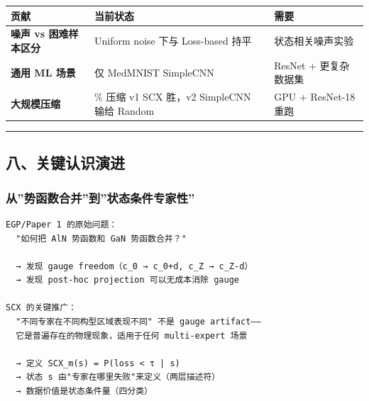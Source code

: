 \documentclass[
  12pt,
]{ctexart}
\begin{document}
\begin{longtable}[]{@{}
  >{\raggedright\arraybackslash}p{}
  >{\raggedright\arraybackslash}p{}
  >{\raggedright\arraybackslash}p{}@{}}
\toprule\noalign{}
\begin{minipage}[b]{\linewidth}\raggedright
贡献
\end{minipage} & \begin{minipage}[b]{\linewidth}\raggedright
当前状态
\end{minipage} & \begin{minipage}[b]{\linewidth}\raggedright
需要
\end{minipage} \\
\midrule\noalign{}
\endhead
\bottomrule\noalign{}
\endlastfoot
\textbf{噪声 vs 困难样本区分} & Uniform noise 下与 Loss-based 持平 &
状态相关噪声实验 \\
\textbf{通用 ML 场景} & 仅 MedMNIST SimpleCNN & ResNet + 更复杂数据集 \\
\textbf{大规模压缩} & 50\% 压缩 v1 SCX 胜，v2 SimpleCNN 输给 Random &
GPU + ResNet-18 重跑 \\
\end{longtable}

\begin{center}\rule{0.5\linewidth}{0.5pt}\end{center}

\subsection{八、关键认识演进}\label{ux516bux5173ux952eux8ba4ux8bc6ux6f14ux8fdb}

\subsubsection{从''势函数合并''到''状态条件专家性''}\label{ux4eceux52bfux51fdux6570ux5408ux5e76ux5230ux72b6ux6001ux6761ux4ef6ux4e13ux5bb6ux6027}

\begin{verbatim}
EGP/Paper 1 的原始问题：
  "如何把 AlN 势函数和 GaN 势函数合并？"
  
  → 发现 gauge freedom（c_0 → c_0+d, c_Z → c_Z-d）
  → 发现 post-hoc projection 可以无成本消除 gauge
  
SCX 的关键推广：
  "不同专家在不同构型区域表现不同" 不是 gauge artifact——
  它是普遍存在的物理现象，适用于任何 multi-expert 场景
  
  → 定义 SCX_m(s) = P(loss < τ | s)
  → 状态 s 由"专家在哪里失败"来定义（两层描述符）
  → 数据价值是状态条件量（四分类）
\end{verbatim}
\end{document}
